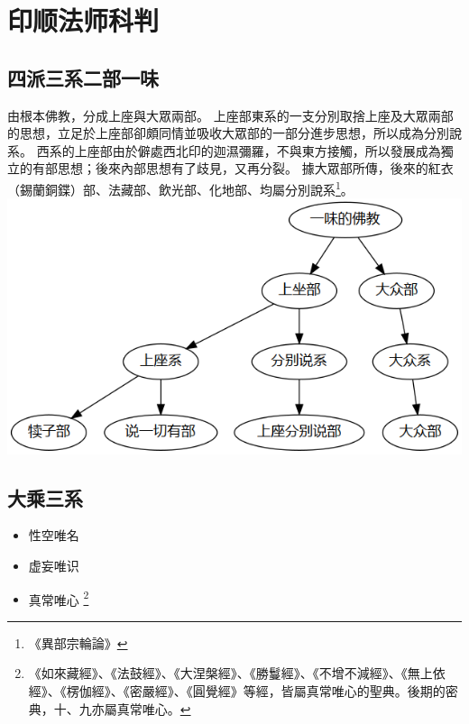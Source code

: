 \section{印顺法师科判}
\subsection{四派三系二部一味}
由根本佛教，分成上座與大眾兩部。
上座部東系的一支分別取捨上座及大眾兩部的思想，立足於上座部卻頗同情並吸收大眾部的一部分進步思想，所以成為分別說系。
西系的上座部由於僻處西北印的迦濕彌羅，不與東方接觸，所以發展成為獨立的有部思想；後來內部思想有了歧見，又再分裂。
據大眾部所傳，後來的紅衣（錫蘭銅鍱）部、法藏部、飲光部、化地部、均屬分別說系\footnote{《異部宗輪論》}。
\includegraphics[scale=0.5]{释家/images/四派三系二部一味.png}

\subsection{大乘三系}
\begin{itemize}
  \item 性空唯名
  \item 虚妄唯识
  \item 真常唯心 \footnote{《如來藏經》、《法鼓經》、《大涅槃經》、《勝鬘經》、《不增不減經》、《無上依經》、《楞伽經》、《密嚴經》、《圓覺經》等經，皆屬真常唯心的聖典。後期的密典，十、九亦屬真常唯心。}
\end{itemize}
